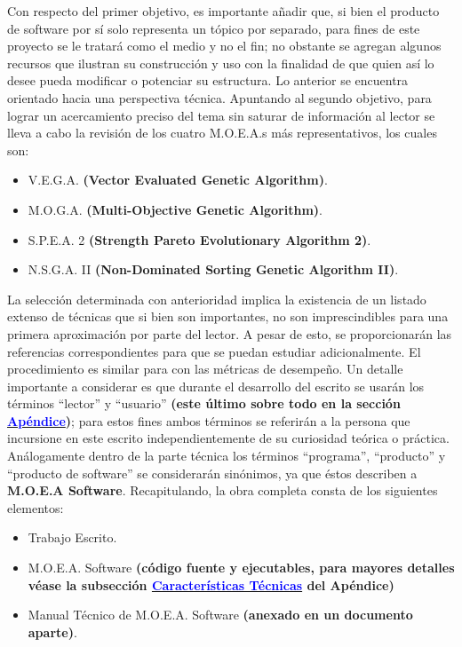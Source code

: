 \documentclass[class=report, crop=false]{standalone}
\begin{document}
Con respecto del primer objetivo, es importante añadir que, si 
bien el producto de software por sí solo representa un tópico 
por separado, para fines de este proyecto se le tratará como 
el medio y no el fin; no obstante se agregan algunos recursos 
que ilustran su construcción y uso con la finalidad de que 
quien así lo desee pueda modificar o potenciar su estructura.\break
Lo anterior se encuentra orientado hacia una perspectiva técnica.\medskip\break 
Apuntando al segundo objetivo, para lograr un acercamiento preciso 
del tema sin saturar de información al lector se lleva a cabo 
la revisión de los cuatro M.O.E.A.s más representativos, los 
cuales son:

\begin{itemize}
\item {V.E.G.A. \textbf{(Vector Evaluated Genetic Algorithm)}.}
\item {M.O.G.A. \textbf{(Multi-Objective Genetic Algorithm)}.}
\item {S.P.E.A. 2 \textbf{(Strength Pareto Evolutionary Algorithm 2)}.}
\item {N.S.G.A. II \textbf{(Non-Dominated Sorting Genetic Algorithm II)}.}
\end{itemize}

La selección determinada con anterioridad implica la existencia 
de un listado extenso de técnicas que si bien son importantes, 
no son imprescindibles para una primera aproximación por parte 
del lector.\break 
A pesar de esto, se proporcionarán las referencias correspondientes 
para que se puedan estudiar adicionalmente.\break
El procedimiento es similar para con las métricas de desempeño.\medskip\break
Un detalle importante a considerar es que durante el desarrollo 
del escrito se usarán los términos ``lector'' y ``usuario'' \textbf{(este último sobre todo en la 
sección \hyperref[sec:c1_1]{\textcolor{blue}{Apéndice}})}; para 
estos fines ambos términos se referirán a la persona que incursione 
en este escrito independientemente de su curiosidad teórica o 
práctica.\break
Análogamente dentro de la parte técnica los términos ``programa'', 
``producto'' y ``producto de software'' se considerarán sinónimos, 
ya que éstos describen a \textbf{M.O.E.A Software}.\medskip\break
Recapitulando, la obra completa consta de los siguientes elementos:

\begin{itemize}
\item Trabajo Escrito.
\item M.O.E.A. Software \textbf{(código fuente y ejecutables, para mayores detalles 
véase la subsección \hyperref[sec:c1_2]{\textcolor{blue}{Características Técnicas}} 
del Apéndice)}
\item Manual Técnico de M.O.E.A. Software \textbf{(anexado en un documento aparte)}.
\end{itemize}
 
\end{document}
